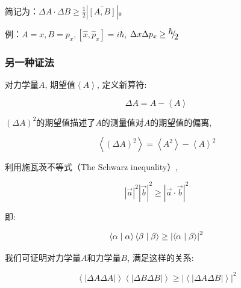 简记为：$\Delta A \cdot \Delta B \ge \frac{1}{2}\left| {\overline
{\left[ {A,B} \right]} } \right|$。

例：$A = x,B = p_x ,\left[ {\hat x,\hat p_x } \right] = i\hbar $, $\Delta x\Delta p_x  \ge {\raise0.7ex\hbox{$\hbar $} \!\mathord{\left/
 {\vphantom {\hbar  2}}\right.\kern-\nulldelimiterspace}
\!\lower0.7ex\hbox{$2$}}$


\subsubsection{另一种证法}


对力学量$A$, 期望值$\left\langle A \right\rangle$, 定义新算符:

\begin{equation*}
    \Delta A = A - \left\langle A \right\rangle
\end{equation*}


${\left( {\Delta A} \right)^2
}$的期望值描述了$A$的测量值对$A$的期望值的偏离,

\begin{equation*}
\left\langle {\left( {\Delta A} \right)^2 } \right\rangle  =
\left\langle {A^2 } \right\rangle  - \left\langle A \right\rangle ^2
\end{equation*}

利用施瓦茨不等式（The Schwarz inequality）,

\begin{equation*}
\left| {\vec a} \right|^2 \left| {\vec b} \right|^2  \ge \left|
{\vec a \cdot \vec b} \right|^2
\end{equation*}

即:

\begin{equation*}
   \left\langle {\alpha }
 \mathrel{\left | {\vphantom {\alpha  \alpha }}
 \right. \kern-\nulldelimiterspace}
 {\alpha } \right\rangle \left\langle {\beta }
 \mathrel{\left | {\vphantom {\beta  \beta }}
 \right. \kern-\nulldelimiterspace}
 {\beta } \right\rangle  \ge \left| {\left\langle {\alpha }
 \mathrel{\left | {\vphantom {\alpha  \beta }}
 \right. \kern-\nulldelimiterspace}
 {\beta } \right\rangle } \right|^2
\end{equation*}

我们可证明对力学量$A$和力学量$B$, 满足这样的关系:


\begin{equation*}
\left\langle {} \right|\Delta A\Delta A\left| {} \right\rangle
\left\langle {} \right|\Delta B\Delta B\left| {} \right\rangle  \ge
\left| {\left\langle {} \right|\Delta A\Delta B\left| {}
\right\rangle } \right|^2
\end{equation*}


